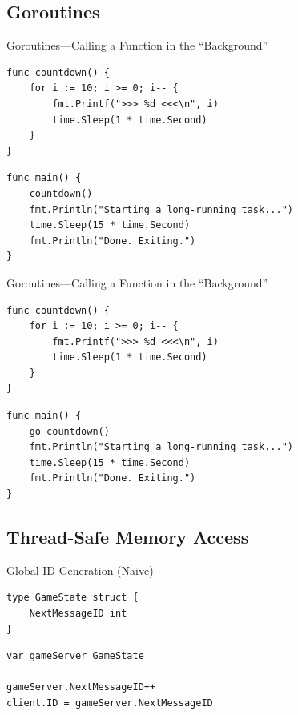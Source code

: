 \documentclass[pdf]{beamer}
\begin{document}
\subsection{Goroutines}

\begin{frame}[fragile]{Goroutines---Calling a Function in the ``Background''}
\begin{lstlisting}
func countdown() {
    for i := 10; i >= 0; i-- {
        fmt.Printf(">>> %d <<<\n", i)
        time.Sleep(1 * time.Second)
    }
}
\end{lstlisting}
\pause
\begin{lstlisting}
func main() {
    countdown()
    fmt.Println("Starting a long-running task...")
    time.Sleep(15 * time.Second)
    fmt.Println("Done. Exiting.")
}
\end{lstlisting}
\end{frame}

\begin{frame}[fragile]{Goroutines---Calling a Function in the ``Background''}
\begin{lstlisting}
func countdown() {
    for i := 10; i >= 0; i-- {
        fmt.Printf(">>> %d <<<\n", i)
        time.Sleep(1 * time.Second)
    }
}
\end{lstlisting}
\begin{lstlisting}
func main() {
    go countdown()
    fmt.Println("Starting a long-running task...")
    time.Sleep(15 * time.Second)
    fmt.Println("Done. Exiting.")
}
\end{lstlisting}
\end{frame}




\subsection{Thread-Safe Memory Access}
\begin{frame}[fragile]{Global ID Generation (Na\"\i ve)}
\begin{lstlisting}
type GameState struct {
    NextMessageID int
}
\end{lstlisting}
\pause
\begin{lstlisting}
var gameServer GameState

gameServer.NextMessageID++
client.ID = gameServer.NextMessageID
\end{lstlisting}
\end{frame}
\end{document}
